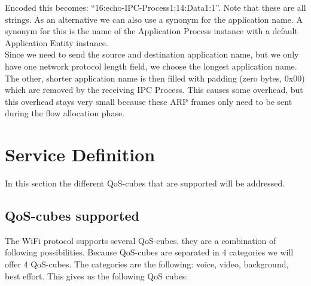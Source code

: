 \npar

Encoded this becomes: ``16:echo-IPC-Process1:14:Data1:1''. Note that these are all strings. As an alternative we can also use a synonym for the application name. A synonym for this is the name of the Application Process instance with a default Application Entity instance. 
\\
Since we need to send the source and destination application name, but we only have one network protocol length field, we choose the longest application name. The other, shorter application name is then filled with padding (zero bytes, 0x00) which are removed by the receiving IPC Process. This causes some overhead, but this overhead stays very small because these ARP frames only need to be sent during the flow allocation phase.


\section{Service Definition}

In this section the different QoS-cubes that are supported will be addressed.

\subsection{QoS-cubes supported}

The WiFi protocol supports several QoS-cubes, they are a combination of following possibilities. 
\npar
Because QoS-cubes are separated in 4 categories we will offer 4 QoS-cubes. The categories are the following: voice, video, background, best effort. This gives us the following QoS cubes:

